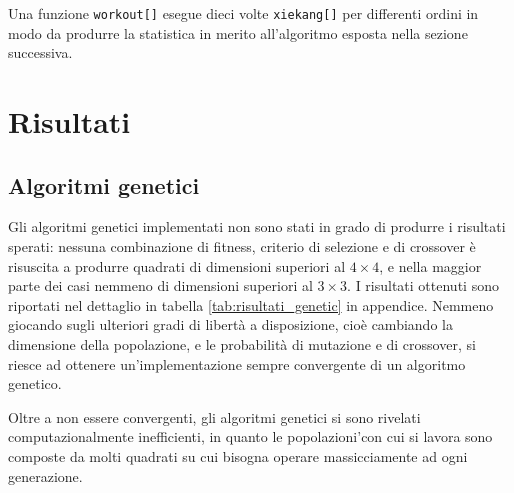 \documentclass[italian,twoside,twocolumn]{article}
\begin{document}
Una funzione \texttt{workout[]} esegue dieci volte \texttt{xiekang[]} per differenti ordini in modo da produrre la statistica in merito all'algoritmo esposta nella sezione successiva.

\section{Risultati}

\subsection{Algoritmi genetici}
Gli algoritmi genetici implementati non sono stati in grado di produrre i risultati sperati: nessuna combinazione di fitness, criterio di selezione e di crossover è risuscita a produrre quadrati di dimensioni superiori al $ 4\times 4 $, e nella maggior parte dei casi nemmeno di dimensioni superiori al $ 3\times 3 $. I risultati ottenuti sono riportati nel dettaglio in tabella \ref{tab:risultati_genetic} in appendice. Nemmeno giocando sugli ulteriori gradi di libertà a disposizione, cioè cambiando la dimensione della popolazione, e le probabilità di mutazione e di crossover, si riesce ad ottenere un'implementazione sempre convergente di un algoritmo genetico. 

Oltre a non essere convergenti, gli algoritmi genetici si sono rivelati computazionalmente inefficienti, in quanto le popolazioni'con cui si lavora sono composte da molti quadrati su cui bisogna operare massicciamente ad ogni generazione. 

\end{document}
